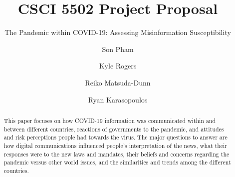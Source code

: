 \documentclass[11pt,sigconf]{acmart}
\begin{document}
\title{CSCI 5502 Project Proposal}
\subtitle{The Pandemic within COVID-19: Assessing Misinformation Susceptibility}

\author{Son Pham}

\author{Kyle Rogers}

\author{Reiko Matsuda-Dunn}

\author{Ryan Karasopoulos}


\renewcommand{\shortauthors}{S. Pham, K. Rogers, R. Matsuda-Dunn, and R. Karasopoulos}


\begin{abstract}
This paper focuses on how COVID-19 information was communicated within and between different countries, reactions of governments to the pandemic, and attitudes and risk perceptions people had towards the virus. The major questions to answer are how digital communications influenced people’s interpretation of the news, what their responses were to the new laws and mandates, their beliefs and concerns regarding the pandemic versus other world issues, and the similarities and trends among the different countries.
\end{abstract}
\end{document}
